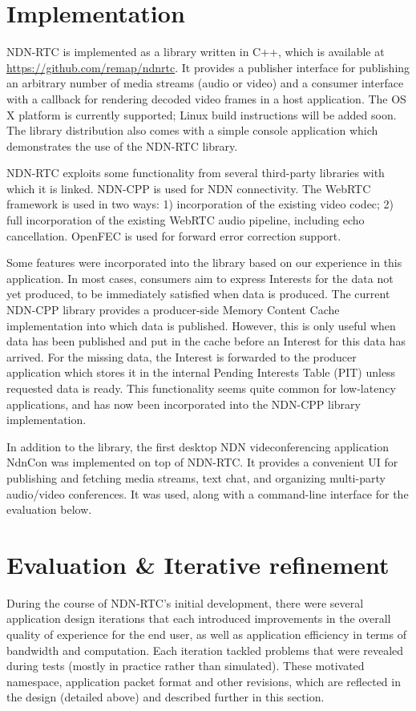 \documentclass{icn/sig-alternate-2012} %
\newcommand{\ndnrtcName}{NDN-RTC} %
\newcommand{\ndnconName}{NdnCon}
\begin{document}
\section{Implementation}
\label{sec:imp}
\ndnrtcName{} is implemented as a library written in C++, which is available at \url{https://github.com/remap/ndnrtc}. 
It provides a publisher interface for publishing an arbitrary number of media streams (audio or video) and a consumer interface with a callback for rendering decoded video frames in a host application. The OS X platform is currently supported; Linux build instructions will be added soon. 
The library distribution also comes with a simple console application which demonstrates the use of the \ndnrtcName{} library.

\ndnrtcName{} exploits some functionality from several third-party libraries with which it is linked. NDN-CPP \cite{ndnccl} is used for NDN connectivity. The WebRTC framework \cite{webrtc} is used in two ways: 1) incorporation of the existing video codec; 2) full incorporation of the existing WebRTC audio pipeline, including echo cancellation. OpenFEC \cite{openfec} is used for forward error correction support. 

Some features were incorporated into the library based on our experience in this application.
 In most cases, consumers aim to express Interests for the data not yet produced, to be immediately satisfied when data is produced. The current NDN-CPP library provides a producer-side Memory Content Cache implementation into which data is published. However, this is only useful when data has been published and put in the cache before an Interest for this data has arrived. For the missing data, the Interest is forwarded to the producer application which stores it in the internal Pending Interests Table (PIT) unless requested data is ready. This functionality seems quite common for low-latency applications, and has now been incorporated into the NDN-CPP library implementation.

In addition to the library, the first desktop NDN videconferencing application \ndnconName{} \cite{ndncon} was implemented on top of \ndnrtcName{}. It provides a convenient UI for publishing and fetching media streams, text chat, and organizing multi-party audio/video conferences. It was used, along with a command-line interface for the evaluation below.

\section{Evaluation \& Iterative refinement}
\label{sec:eval} 
During the course of \ndnrtcName{}'s initial development, there were several application design iterations that each introduced improvements in the overall quality of experience for the end user, as well as application efficiency in terms of bandwidth and computation. Each iteration tackled problems that were revealed during tests (mostly in practice rather than simulated). These motivated namespace, application packet format and other revisions, which are reflected in the design (detailed above) and described further in this section. 
\end{document}
